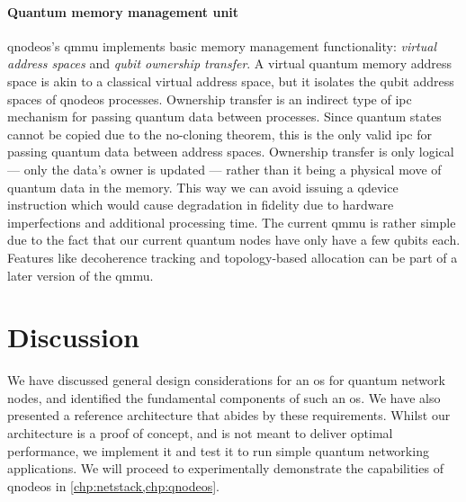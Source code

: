 \paragraph{Quantum memory management unit}

\acrshort{qnodeos}'s \acrshort{qmmu} implements basic memory management functionality: \emph{virtual
address spaces} and \emph{qubit ownership transfer}. A virtual quantum memory address space is akin
to a classical virtual address space, but it isolates the qubit address spaces of \acrshort{qnodeos}
processes. Ownership transfer is an indirect type of \acrfull{ipc} mechanism for passing quantum
data between processes. Since quantum states cannot be copied due to the no-cloning theorem, this is
the only valid \acrshort{ipc} for passing quantum data between address spaces. Ownership transfer is
only logical --- only the data's owner is updated --- rather than it being a physical move of
quantum data in the memory. This way we can avoid issuing a \acrshort{qdevice} instruction which
would cause degradation in fidelity due to hardware imperfections and additional processing time.
The current \acrshort{qmmu} is rather simple due to the fact that our current quantum nodes have
only have a few qubits each. Features like decoherence tracking and topology-based allocation can be
part of a later version of the \acrshort{qmmu}.

\section{Discussion}

We have discussed general design considerations for an \acrshort{os} for quantum network nodes, and
identified the fundamental components of such an \acrshort{os}. We have also presented a reference
architecture that abides by these requirements. Whilst our architecture is a proof of concept, and
is not meant to deliver optimal performance, we implement it and test it to run simple quantum
networking applications. We will proceed to experimentally demonstrate the capabilities of
\acrshort{qnodeos} in \cref{chp:netstack,chp:qnodeos}.

\printbibliography[heading=subbibintoc,title={References},notcategory=noprint]
